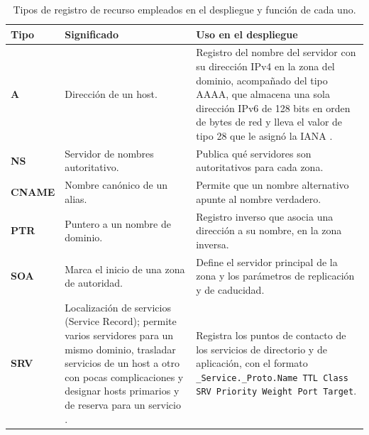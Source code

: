 \documentclass[12pt]{article}
\begin{document}
\begin{table}[H]
\centering
\small
\renewcommand{\arraystretch}{1.15}
\renewcommand{\tabularxcolumn}[1]{m{#1}}
\setlength{\emergencystretch}{1.5em}
\caption{Tipos de registro de recurso empleados en el despliegue y función de cada uno.}
\label{tab:tiposRegistroDns}
\begin{tabularx}{\textwidth}{>{\centering\arraybackslash}m{2.4cm} X X}
\toprule
\textbf{Tipo} & \textbf{Significado} & \textbf{Uso en el despliegue} \\
\midrule
\textbf{A} & Dirección de un host. & Registro del nombre del servidor con su dirección IPv4 en la zona del dominio, acompañado del tipo AAAA, que almacena una sola dirección IPv6 de 128 bits en orden de bytes de red y lleva el valor de tipo 28 que le asignó la IANA \parencite[\S 2.1, p.\ 3]{rfc3596}. \\
\addlinespace
\textbf{NS} & Servidor de nombres autoritativo. & Publica qué servidores son autoritativos para cada zona. \\
\addlinespace
\textbf{CNAME} & Nombre canónico de un alias. & Permite que un nombre alternativo apunte al nombre verdadero. \\
\addlinespace
\textbf{PTR} & Puntero a un nombre de dominio. & Registro inverso que asocia una dirección a su nombre, en la zona inversa. \\
\addlinespace
\textbf{SOA} & Marca el inicio de una zona de autoridad. & Define el servidor principal de la zona y los parámetros de replicación y de caducidad. \\
\addlinespace
\textbf{SRV} & Localización de servicios (Service Record); permite varios servidores para un mismo dominio, trasladar servicios de un host a otro con pocas complicaciones y designar hosts primarios y de reserva para un servicio \parencite[\S 1, p.\ 1]{rfc2782}. & Registra los puntos de contacto de los servicios de directorio y de aplicación, con el formato \texttt{\_Service.\_Proto.Name TTL Class SRV Priority Weight Port Target}. \\
\bottomrule
\end{tabularx}
\end{table}
\end{document}
